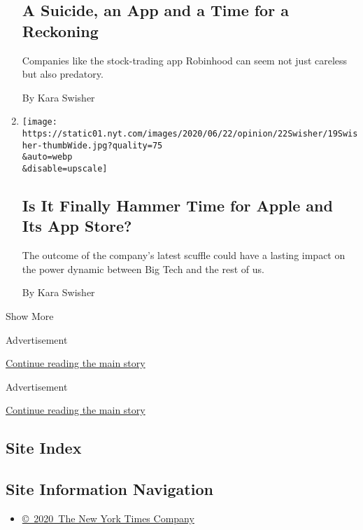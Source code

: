 \begin{enumerate}
  \hypertarget{a-suicide-an-app-and-a-time-for-a-reckoning}{%
  \subsection{A Suicide, an App and a Time for a
  Reckoning}\label{a-suicide-an-app-and-a-time-for-a-reckoning}}

  Companies like the stock-trading app Robinhood can seem not just
  careless but also predatory.

  By Kara Swisher
\item
  \href{/2020/06/19/opinion/apple-app-store-hey.html}{}

  \texttt{[image: https://static01.nyt.com/images/2020/06/22/opinion/22Swisher/19Swisher-thumbWide.jpg?quality=75\\\&auto=webp\\\&disable=upscale]}

  \hypertarget{is-it-finally-hammer-time-for-apple-and-its-app-store}{%
  \subsection{Is It Finally Hammer Time for Apple and Its App
  Store?}\label{is-it-finally-hammer-time-for-apple-and-its-app-store}}

  The outcome of the company's latest scuffle could have a lasting
  impact on the power dynamic between Big Tech and the rest of us.

  By Kara Swisher
\end{enumerate}

Show More

Advertisement

\protect\hyperlink{after-mid1}{Continue reading the main story}

Advertisement

\protect\hyperlink{after-mktg}{Continue reading the main story}

\hypertarget{site-index}{%
\subsection{Site Index}\label{site-index}}

\hypertarget{site-information-navigation}{%
\subsection{Site Information
Navigation}\label{site-information-navigation}}

\begin{itemize}
\tightlist
\item
  \href{https://help.nytimes.com/hc/en-us/articles/115014792127-Copyright-notice}{©~2020~The
  New York Times Company}
\end{itemize}

